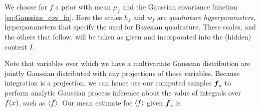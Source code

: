 \documentclass{article}
\begin{document}
% 
% 
% 
% 
% 
% 
% 
% 
% 
% 

We choose for $f$ a 
\gpb prior with mean $\mu_f$ and the Gaussian covariance function \eqref{eq:Gaussian_cov_fn}.
Here the scales $h_f$ and $w_f$ are \emph{quadrature hyperparameters}, hyperparameters that specify the
 \gpb used for Bayesian quadrature. These scales, and the others that follow, will be taken as given and incorporated into the (hidden) context $I$.


Note that variables over which we have a multivariate Gaussian distribution are jointly Gaussian distributed with any projections of those variables. Because integration is a projection, we can hence use our computed samples $\vf_s$ to perform analytic Gaussian process inference about the value of integrals over $f(\lfv)$, such as $\inty{f}$. Our mean estimate for $\inty{f}$ given $\vf_s$ is
\end{document}
